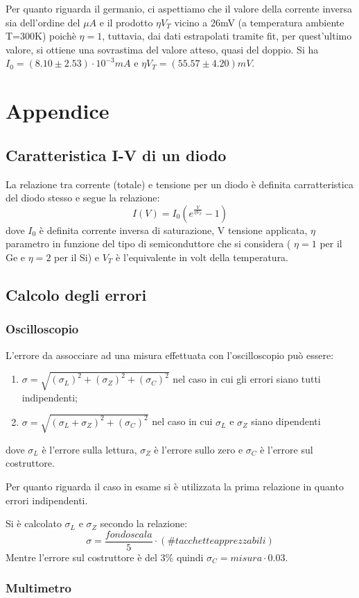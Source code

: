 \documentclass[a4paper, 11pt]{article}
\begin{document}
Per quanto riguarda il germanio, ci aspettiamo che il valore della corrente inversa sia dell'ordine del $\mu A$ e il prodotto $\eta V_T$ vicino a 26mV (a temperatura ambiente T=300K) poichè $\eta = 1$, tuttavia, dai dati estrapolati tramite fit, per quest'ultimo valore, si ottiene una sovrastima del valore atteso, quasi del doppio. Si ha $I_0 = ( 8.10 \pm 2.53) \cdot 10^{-3} mA $ e $\eta V_T = ( 55.57 \pm 4.20) mV$.  

\section{Appendice}

\subsection{Caratteristica I-V di un diodo}
\label{carIV}
La relazione tra corrente (totale) e tensione per un diodo è definita  carratteristica del diodo stesso e segue la relazione:
\begin{equation}
    I(V)=I_0 (e^{\frac{V}{\eta V_T}}-1)
    \label{eq:caratteristica IV}
\end{equation}
dove $I_0$ è definita corrente inversa di saturazione, V  tensione applicata, $\eta$ parametro in funzione del tipo di semiconduttore che si considera ( $\eta = 1 $ per il Ge e $\eta = 2$ per il Si) e $V_T$ è l'equivalente in volt della temperatura.
\subsection{Calcolo degli errori}
\label{errori}
\subsubsection{Oscilloscopio}
L'errore da assocciare ad una misura effettuata con l'oscilloscopio può essere:
\begin{enumerate}
    \item $\sigma = \sqrt{(\sigma_L)^2 + (\sigma_Z)^2 + (\sigma_C)^2}$ nel caso in cui gli errori siano tutti indipendenti;
    \item  $\sigma = \sqrt{(\sigma_L + \sigma_Z)^2 + (\sigma_C)^2}$ nel caso in cui $\sigma_L$ e $\sigma_Z$ siano dipendenti
    \end{enumerate}
dove $\sigma_L$ è l'errore sulla lettura, $\sigma_Z$ è l'errore sullo zero e $\sigma_C$ è l'errore sul costruttore. 

Per quanto riguarda il caso in esame si è utilizzata la prima relazione in quanto errori indipendenti.

Si è calcolato $\sigma_L$ e $\sigma_Z$
secondo la relazione: 
\begin{equation*}
    \sigma = \frac{fondo scala}{5} \cdot ( \# tacchette apprezzabili)
\end{equation*}
Mentre l'errore sul costruttore è del 3\% quindi $\sigma_C = misura \cdot 0.03$.

\subsubsection{Multimetro}
\end{document}
